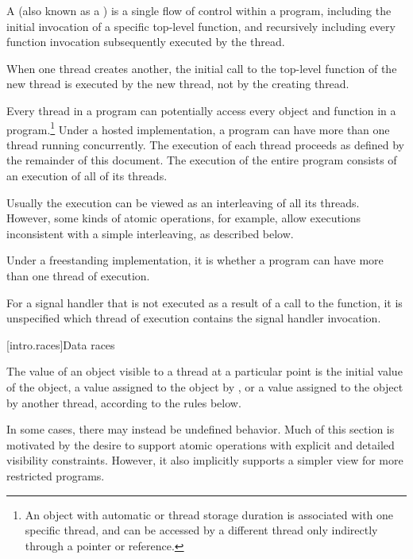 \pnum
{}%
%
A  (also known as a ) is a single flow of
control within a program, including the initial invocation of a specific
top-level function, and recursively including every function invocation
subsequently executed by the thread. \begin{note} When one thread creates another,
the initial call to the top-level function of the new thread is executed by the
new thread, not by the creating thread. \end{note} Every thread in a program can
potentially access every object and function in a program.\footnote{An object
with automatic or thread storage duration is associated with
one specific thread, and can be accessed by a different thread only indirectly
through a pointer or reference.} Under a hosted
implementation, a \Cpp program can have more than one thread running
concurrently. The execution of each thread proceeds as defined by the remainder
of this document. The execution of the entire program consists of an execution
of all of its threads. \begin{note} Usually the execution can be viewed as an
interleaving of all its threads. However, some kinds of atomic operations, for
example, allow executions inconsistent with a simple interleaving, as described
below. \end{note} Under a freestanding implementation, it is  whether a program can
have more than one thread of execution.

\pnum
For a signal handler that is not executed as a result of a call to the
 function, it is unspecified which thread of execution
contains the signal handler invocation.

[intro.races]{Data races}

\pnum
The value of an object visible to a thread  at a particular point is the
initial value of the object, a value assigned to the object by , or a
value assigned to the object by another thread, according to the rules below.
\begin{note} In some cases, there may instead be undefined behavior. Much of this
section is motivated by the desire to support atomic operations with explicit
and detailed visibility constraints. However, it also implicitly supports a
simpler view for more restricted programs. \end{note}

